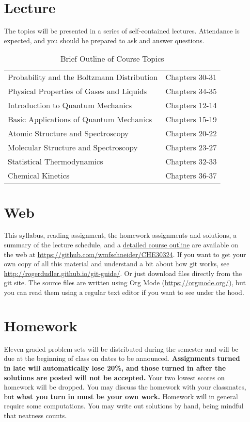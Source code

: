 \documentclass[11pt]{article}
\begin{document}
\section{Lecture}
\label{sec:org2b27e35}
The topics will be presented in a series of self-contained
lectures. Attendance is expected, and you should be prepared to ask
and answer questions.  

\begin{table}[htbp]
\caption{Brief Outline of Course Topics}
\centering
\begin{tabular}{ll}
\hline
Probability and the Boltzmann Distribution & Chapters 30-31\\
Physical Properties of Gases and Liquids & Chapters 34-35\\
Introduction to Quantum Mechanics & Chapters 12-14\\
Basic Applications of Quantum Mechanics & Chapters 15-19\\
Atomic Structure and Spectroscopy & Chapters 20-22\\
Molecular Structure and Spectroscopy & Chapters 23-27\\
Statistical Thermodynamics & Chapters 32-33\\
Chemical Kinetics & Chapters 36-37\\
\hline
\end{tabular}
\end{table}

\section{Web}
\label{sec:org98359d2}
This syllabus, reading assignment, the homework assignments and solutions, a summary of the lecture schedule, and a \href{https://github.com/wmfschneider/CHE30324/tree/master/Outline/CHE30324-outline.pdf}{detailed course outline} are available on the web at \url{https://github.com/wmfschneider/CHE30324}.  If you want to get your own copy of all this material and understand a bit about how git works, see \url{http://rogerdudler.github.io/git-guide/}.  Or just download files directly from the git site. The source files are written using Org Mode (\url{https://orgmode.org/}), but you can read them using a regular text editor if you want to see under the hood.

\section{Homework}
\label{sec:orga51bba2}
Eleven graded problem sets will be distributed during the semester and will be due at the beginning of class on dates to be announced.  \textbf{Assignments turned in late will automatically lose 20\%, and those turned in after the solutions are posted will not be accepted.}  Your two lowest scores on homework will be dropped.  You may discuss the homework with your classmates, but \textbf{what you turn in must be your own work.}
Homework will in general require some computations. You may write out solutions by hand, being mindful that neatness counts. 
\end{document}
